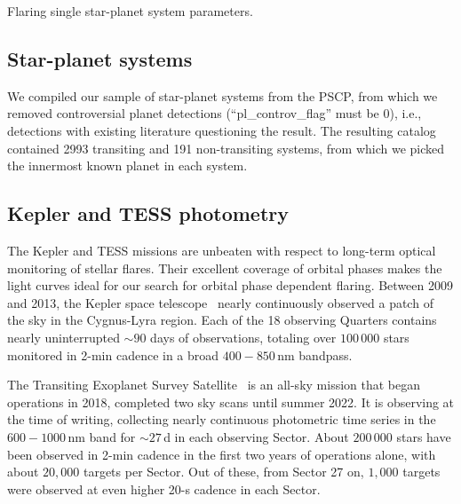 \documentclass[twocolumn]{aastex631}
\begin{document}
\begin{table*}
\movetableright=-20mm

    \caption{Flaring single star-planet system parameters.}
    
    
        \label{tab:maintable_lit}
    \tablerefs{}
\end{table*}



\subsection{Star-planet systems}
\label{sec:data:sps}
We compiled our sample of star-planet systems from the PSCP, from which we removed controversial planet detections (``pl\_controv\_flag'' must be 0), i.e., detections with existing literature questioning the result. The resulting catalog contained 2993 transiting and 191 non-transiting systems, from which we picked the innermost known planet in each system. 

\subsection{Kepler and TESS photometry}
\label{sec:data:photometry}
The Kepler and TESS missions are unbeaten with respect to long-term optical monitoring of stellar flares. Their excellent coverage of orbital phases makes the light curves ideal for our search for orbital phase dependent flaring. Between 2009 and 2013, the Kepler space telescope~\citep{koch2010kepler} nearly continuously observed a patch of the sky in the Cygnus-Lyra region. Each of the 18 observing Quarters contains nearly uninterrupted $\sim 90$ days of observations, totaling over $100\,000$ stars monitored in 2-min cadence in a broad $400-850\,$nm bandpass.

The Transiting Exoplanet Survey Satellite~\citep[TESS,][]{ricker2015transiting} is an all-sky mission that began operations in 2018, completed two sky scans until summer 2022. It is observing at the time of writing, collecting nearly continuous photometric time series in the $600-1000\,$nm band for $\sim 27\,$d in each observing Sector. About $200\,000$ stars have been observed in 2-min cadence in the first two years of operations alone, with about $20,000$ targets per Sector. Out of these, from Sector 27 on, $1,000$ targets were observed at even higher 20-s cadence in each Sector. 
\end{document}
